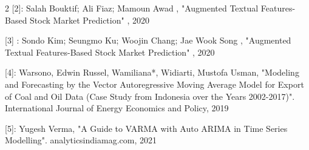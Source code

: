 \documentclass{article}
\begin{document}
\begin{multicols}{2}
[2]: Salah Bouktif; Ali Fiaz; Mamoun Awad , "Augmented Textual Features-Based Stock Market Prediction" , 2020 

[3] : Sondo Kim; Seungmo Ku; Woojin Chang; Jae Wook Song , "Augmented Textual Features-Based Stock Market Prediction" , 2020 


[4]: Warsono, Edwin Russel, Wamiliana*, Widiarti, Mustofa Usman, "Modeling and Forecasting by the Vector Autoregressive Moving Average Model for Export of Coal and Oil Data (Case Study from Indonesia over the Years 2002-2017)". International Journal of Energy Economics and Policy, 2019

[5]: Yugesh Verma, "A Guide to VARMA with Auto ARIMA in Time Series Modelling". analyticsindiamag.com, 2021 




\end{multicols}
\end{document}
